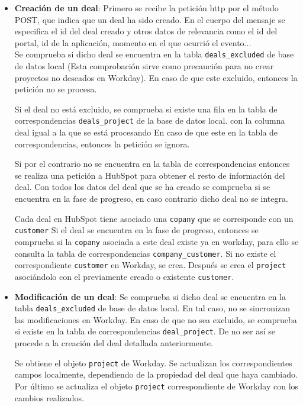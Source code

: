 \begin{itemize}
	\item \textbf{Creación de un deal}: Primero se recibe la petición \acrshort{http} por el método POST, que indica que un deal ha sido creado. En el cuerpo del mensaje se especifica el id del deal creado y otros datos de relevancia como el id del portal, id de la aplicación, momento en el que ocurrió el evento... \\
	
		Se comprueba si dicho deal se encuentra en la tabla \verb|deals_excluded| de base de datos local (Esta comprobación sirve como precaución para no crear proyectos no deseados en Workday).
		En caso de que este excluido, entonces la petición no se procesa.
		
		Si el deal no está excluido, se comprueba si existe una fila en la tabla de correspondencias \verb|deals_project| de la base de datos local.
		con la columna deal igual a la que se está procesando %
		En caso de que este en la tabla de correspondencias, entonces la petición se ignora.

		Si por el contrario no se encuentra en la tabla de correspondencias entonces se realiza una petición a HubSpot para obtener el resto de información del deal.
		Con todos los datos del deal que se ha creado se comprueba si se encuentra en la fase de progreso, en caso contrario dicho deal no se integra.
		
		
		
		Cada deal en HubSpot tiene asociado una \verb|copany| que se corresponde con un \verb|customer|
		Si el deal se encuentra en la fase de progreso, entonces se comprueba si la \verb|copany| asociada a este deal existe ya en workday, para ello se consulta la tabla de correspondencias \verb|company_customer|. Si no existe el correspondiente \verb|customer| en Workday, se crea.
		Después se crea el \verb|project| asociándolo con el previamente creado o existente \verb|customer|.
		
		
		
		
		
	\item \textbf{Modificación de un deal}:
		Se comprueba si dicho deal se encuentra en la tabla \verb|deals_excluded| de base de datos local. En tal caso, no se sincronizan las modificaciones en Workday.
		En caso de que no sea excluido, se comprueba si existe en la tabla de correspondencias \verb|deal_project|. De no ser así se procede a la creación del deal detallada anteriormente.
		
		
		
		Se obtiene el objeto \verb|project| de Workday. Se actualizan los correspondientes campos localmente, dependiendo de la propiedad del deal que haya cambiado. Por último se actualiza el objeto \verb|project| correspondiente de Workday con los cambios realizados.
		
		
		

\end{itemize}



